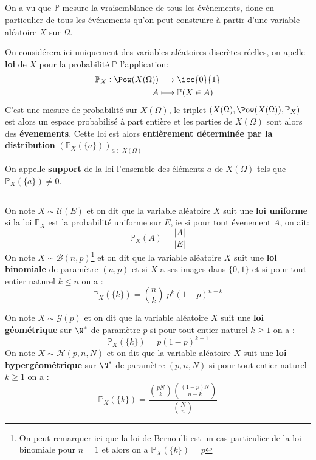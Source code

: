 \subsection*{}
On a vu que \(\mathbb{P}\) mesure la vraisemblance de tous les événements, donc en particulier de tous les événements qu'on peut construire à partir d'une variable aléatoire \(X\) sur \(\Omega\).\<

On considérera ici uniquement des variables aléatoires discrètes réelles, on apelle \textbf{loi} de \(X\) pour la probabilité \(\mathbb{P}\) l'application:
\[
   \begin{aligned}
      \mathbb{P}_X: \Pow(X(\Omega)) &\longrightarrow \icc{0}{1}\\
      A &\longmapsto \mathbb{P}(X \in A)
   \end{aligned}
\]
C'est une mesure de probabilité sur \(X(\Omega)\), le triplet \((X(\Omega), \Pow(X(\Omega)), \mathbb{P}_X)\) est alors un espace probabilisé à part entière et les parties de \(X(\Omega)\) sont alors des \textbf{évenements}.\+
Cette loi est alors \textbf{entièrement déterminée par la distribution} \((\mathbb{P}_X(\{a\}))_{a \in X(\Omega)}\)\< 

On appelle \textbf{support} de la loi l'ensemble des éléments \(a\) de \(X(\Omega)\) tels que  \(\mathbb{P}_X(\{a\}) \neq 0\).\+
\subsection*{}
On note \(X \sim \mathcal{U}(E)\) et on dit que la variable aléatoire \(X\) suit une \textbf{loi uniforme} si la loi \(\mathbb{P}_X\) est la probabilité uniforme sur \(E\), ie si pour tout évenement \(A\), on ait:
\[
   \mathbb{P}_X(A) = \frac{|A|}{|E|}  
\]
On note \(X \sim \mathcal{B}(n, p)\)\footnote{On peut remarquer ici que la loi de Bernoulli est un cas particulier de la loi binomiale pour \(n = 1\) et alors on a \(\mathbb{P}_X(\{k\}) = p\)} et on dit que la variable aléatoire \(X\) suit une \textbf{loi binomiale} de paramètre \((n, p)\) et  si \(X\) a ses images dans \(\{0, 1\}\) et si pour tout entier naturel \(k \leq n\) on a :
\[
   \mathbb{P}_X(\{k\}) = \binom{n}{k} \; p^k(1-p)^{n-k}
\]

On note \(X \sim \mathcal{G}(p)\) et on dit que la variable aléatoire \(X\) suit une \textbf{loi géométrique} sur \(\N^*\) de paramètre \(p\) si pour tout entier naturel \(k \geq 1\) on a :
\[
   \mathbb{P}_X(\{k\}) = p(1 - p)^{k - 1}
\]
On note \(X \sim \mathcal{H}(p, n, N)\) et on dit que la variable aléatoire \(X\) suit une \textbf{loi hypergéométrique} sur \(\N^*\) de paramètre \((p, n, N)\) si pour tout entier naturel \(k \geq 1\) on a :
\[
   \mathbb{P}_X(\{k\}) = \frac{\binom{pN}{k}\binom{(1-p)N}{n - k}}{\binom{N}{n}}
\]

